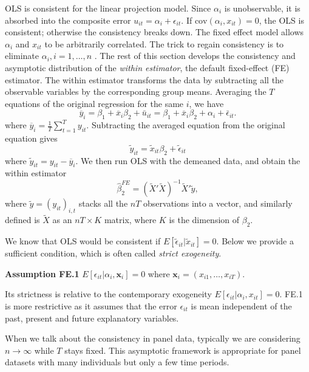 \documentclass[11pt]{article}
\begin{document}
OLS is consistent for the linear projection model. Since \(\alpha_i\) is
unobservable, it is absorbed into the composite error
\(u_{it} = \alpha_i + \epsilon_{it}\). If
\(\mathrm{cov}\left(\alpha_{i},x_{it}\right)=0\), the OLS is consistent;
otherwise the consistency breaks down. The fixed effect model allows
\(\alpha_{i}\) and \(x_{it}\) to be arbitrarily correlated. The trick to
regain consistency is to eliminate \(\alpha_{i},i=1,\ldots,n\) . The
rest of this section develops the consistency and asymptotic
distribution of the \emph{within estimator}, the default fixed-effect
(FE) estimator. The within estimator transforms the data by subtracting
all the observable variables by the corresponding group means. Averaging
the \(T\) equations of the original regression for the same \(i\), we
have
\[\overline{y}_{i}=\beta_{1}+\overline{x}_{i}\beta_{2}+\bar{u}_{it}=\beta_{1}+\overline{x}_{i}\beta_{2}+\alpha_{i}+\bar{\epsilon}_{it}.\label{eq:group_mean}\]
where \(\overline{y}_{i}=\frac{1}{T}\sum_{t=1}^{T}y_{it}\). Subtracting
the averaged equation from the original equation gives
\[\tilde{y}_{it}=\tilde{x}_{it}\beta_{2}+\tilde{\epsilon}_{it}\label{eq:FE_demean}\]
where \(\tilde{y}_{it}=y_{it}-\overline{y}_{i}\). We then run OLS with
the demeaned data, and obtain the within estimator
\[\widehat{\beta}_{2}^{FE}=\left(\tilde{X}'\tilde{X}\right)^{-1}\tilde{X}'\tilde{y},\]
where \(\tilde{y}=\left(y_{it}\right)_{i,t}\) stacks all the \(nT\)
observations into a vector, and similarly defined is \(\tilde{X}\) as an
\(nT\times K\) matrix, where \(K\) is the dimension of \(\beta_{2}\).

    We know that OLS would be consistent if
\(E\left[\tilde{\epsilon}_{it}|\tilde{x}_{it}\right]=0\). Below we
provide a sufficient condition, which is often called \emph{strict
exogeneity}.

\textbf{Assumption FE.1}
\(E\left[\epsilon_{it}|\alpha_{i},\mathbf{x}_{i}\right]=0\) where
\(\mathbf{x}_{i}=\left(x_{i1},\ldots,x_{iT}\right)\).

Its strictness is relative to the contemporary exogeneity
\(E\left[\epsilon_{it}|\alpha_{i},x_{it}\right]=0\). FE.1 is more
restrictive as it assumes that the error \(\epsilon_{it}\) is mean
independent of the past, present and future explanatory variables.

When we talk about the consistency in panel data, typically we are
considering \(n\to\infty\) while \(T\) stays fixed. This asymptotic
framework is appropriate for panel datasets with many individuals but
only a few time periods.
\end{document}
